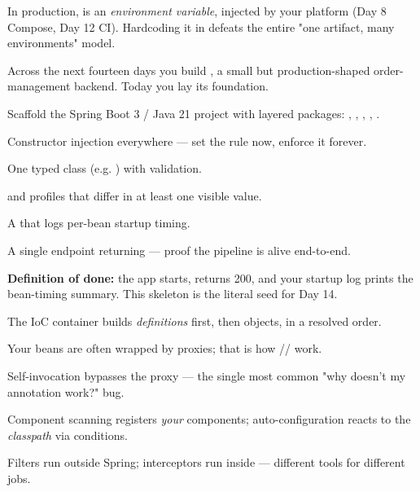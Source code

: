 \begin{prodtip}
In production,  is an \emph{environment variable}, injected by your platform (Day 8 Compose, Day 12 CI). Hardcoding it in  defeats the entire "one artifact, many environments" model.
\end{prodtip}


Across the next fourteen days you build , a small but production-shaped order-management backend. Today you lay its foundation.

\begin{buildalong}
\begin{wbitem}
  \item Scaffold the Spring Boot 3 / Java 21 project with layered packages: , , , , .
  \item Constructor injection everywhere — set the rule now, enforce it forever.
  \item One typed  class (e.g. ) with validation.
  \item {} and  profiles that differ in at least one visible value.
  \item A  that logs per-bean startup timing.
  \item A single  endpoint returning  — proof the pipeline is alive end-to-end.
\end{wbitem}
\smallskip\textbf{Definition of done:} the app starts,  returns 200, and your startup log prints the bean-timing summary. This skeleton is the literal seed for Day 14.
\end{buildalong}


\begin{tickcheck}
  \item The IoC container builds \emph{definitions} first, then objects, in a resolved order.
  \item Your beans are often wrapped by proxies; that is how // work.
  \item Self-invocation bypasses the proxy — the single most common "why doesn't my annotation work?" bug.
  \item Component scanning registers \emph{your} components; auto-configuration reacts to the \emph{classpath} via conditions.
  \item Filters run outside Spring; interceptors run inside — different tools for different jobs.
\end{tickcheck}

